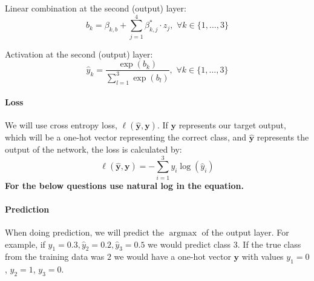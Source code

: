 \documentclass[11pt,addpoints,answers]{exam}
\newcommand{\yv}{\mathbf{y}}
\newcommand \argmax {\operatorname*{argmax}}
\begin{document}
\begin{questions}
Linear combination at the second (output) layer:
\begin{equation}
\label{eqn:b}
b_k = \beta_{k, b} + \sum_{j=1}^4 \beta^*_{k,j}\cdot z_j,\,\, \forall k \in \{1,\ldots,3\}
\end{equation}

Activation at the second (output) layer:
\begin{equation}
\label{eqn:yhat}
\hat{y}_k = \frac{\exp(b_k)}{\sum\limits_{l=1}^3 \exp(b_l)},\,\, \forall k \in \{1,\ldots,3\}
\end{equation}

\paragraph{Loss}

We will use cross entropy loss, $\ell(\hat{\yv},\yv)$. If $\yv$ represents our target output, which will be a one-hot vector representing the correct class, and $\hat{\yv}$ represents the output of the network, the loss is calculated by:
\begin{equation}
\label{eqn:loss}
  \ell(\hat{\yv},\yv) = - \sum_{i=1}^3 y_i \log(\hat{y}_i)
\end{equation}
{\bf For the below questions use natural log in the equation.} \\

\paragraph{Prediction}
When doing prediction, we will predict the $\argmax$ of the output layer. For example, if $\hat{y}_1=0.3, \hat{y}_2=0.2, \hat{y}_3=0.5$ we would predict class 3. If the true class from the training data was $2$ we would have a one-hot vector $\yv$ with values $y_1=0$, $y_2=1$, $y_3=0$.

\begin{parts}


\end{parts}
\end{questions}
\end{document}

